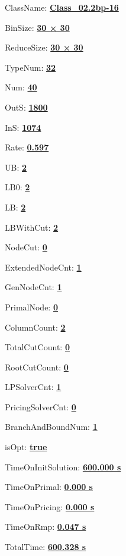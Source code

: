 \documentclass[11pt]{article}
\begin{document}
\pagestyle{empty}


ClassName: \underline{\textbf{Class_02.2bp-16}}
\par
BinSize: \underline{\textbf{30 × 30}}
\par
ReduceSize: \underline{\textbf{30 × 30}}
\par
TypeNum: \underline{\textbf{32}}
\par
Num: \underline{\textbf{40}}
\par
OutS: \underline{\textbf{1800}}
\par
InS: \underline{\textbf{1074}}
\par
Rate: \underline{\textbf{0.597}}
\par
UB: \underline{\textbf{2}}
\par
LB0: \underline{\textbf{2}}
\par
LB: \underline{\textbf{2}}
\par
LBWithCut: \underline{\textbf{2}}
\par
NodeCut: \underline{\textbf{0}}
\par
ExtendedNodeCnt: \underline{\textbf{1}}
\par
GenNodeCnt: \underline{\textbf{1}}
\par
PrimalNode: \underline{\textbf{0}}
\par
ColumnCount: \underline{\textbf{2}}
\par
TotalCutCount: \underline{\textbf{0}}
\par
RootCutCount: \underline{\textbf{0}}
\par
LPSolverCnt: \underline{\textbf{1}}
\par
PricingSolverCnt: \underline{\textbf{0}}
\par
BranchAndBoundNum: \underline{\textbf{1}}
\par
isOpt: \underline{\textbf{true}}
\par
TimeOnInitSolution: \underline{\textbf{600.000 s}}
\par
TimeOnPrimal: \underline{\textbf{0.000 s}}
\par
TimeOnPricing: \underline{\textbf{0.000 s}}
\par
TimeOnRmp: \underline{\textbf{0.047 s}}
\par
TotalTime: \underline{\textbf{600.328 s}}
\par
\newpage
\end{document}
